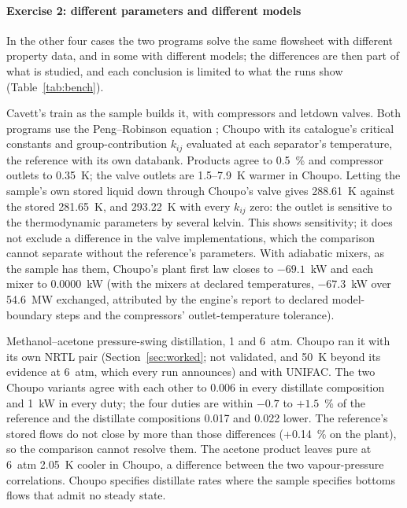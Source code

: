 \documentclass[preprint,12pt]{elsarticle}
\begin{document}
\paragraph{Exercise 2: different parameters and different models}  In the
other four cases the two programs solve the same flowsheet with different
property data, and in some with different models; the differences are
then part of what is studied, and each conclusion is limited to what the
runs show (Table~\ref{tab:bench}).
\begin{description}[leftmargin=1.2em, itemsep=2pt]
\item[A] Cavett's train as the sample builds it, with compressors and
  letdown valves.  Both programs use the Peng--Robinson equation
  \citep{peng1976}; Choupo with its catalogue's critical constants and
  group-contribution $k_{ij}$ evaluated at each separator's temperature,
  the reference with its own databank.  Products agree to 0.5~\% and
  compressor outlets to 0.35~K; the valve outlets are 1.5--7.9~K warmer in
  Choupo.  Letting the sample's own stored liquid down through Choupo's
  valve gives 288.61~K against the stored 281.65~K, and 293.22~K with every
  $k_{ij}$ zero: the outlet is sensitive to the thermodynamic parameters by
  several kelvin.  This shows sensitivity; it does not exclude a difference
  in the valve implementations, which the comparison cannot separate
  without the reference's parameters.  With adiabatic mixers, as the sample
  has them, Choupo's plant first law closes to $-69.1$~kW and each mixer
  to 0.0000~kW (with the mixers at declared temperatures, $-67.3$~kW over
  54.6~MW exchanged, attributed by the engine's report to declared
  model-boundary steps and the compressors' outlet-temperature tolerance).
\item[B] Methanol--acetone pressure-swing distillation, 1 and 6~atm.
  Choupo ran it with its own NRTL pair (Section~\ref{sec:worked}; not
  validated, and 50~K beyond its evidence at 6~atm, which every run
  announces) and with UNIFAC.  The two Choupo variants agree with each
  other to 0.006 in every distillate composition and 1~kW in every duty;
  the four duties are within $-0.7$ to $+1.5$~\% of the reference and the
  distillate compositions 0.017 and 0.022 lower.  The reference's stored
  flows do not close by more than those differences (+0.14~\% on the
  plant), so the comparison cannot resolve them.  The acetone product
  leaves pure at 6~atm 2.05~K cooler in Choupo, a difference between the
  two vapour-pressure correlations.  Choupo specifies distillate rates
  where the sample specifies bottoms flows that admit no steady state.

\end{description}
\end{document}
